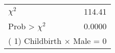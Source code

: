 \begin{tabular}{lr}
\toprule
$\chi^2$ &    114.41 \\
Prob > $\chi^2$ &    0.0000 \\
\bottomrule
\multicolumn{2}{l}{\footnotesize ( 1) Childbirth $\times$ Male = 0}\\
\end{tabular}
